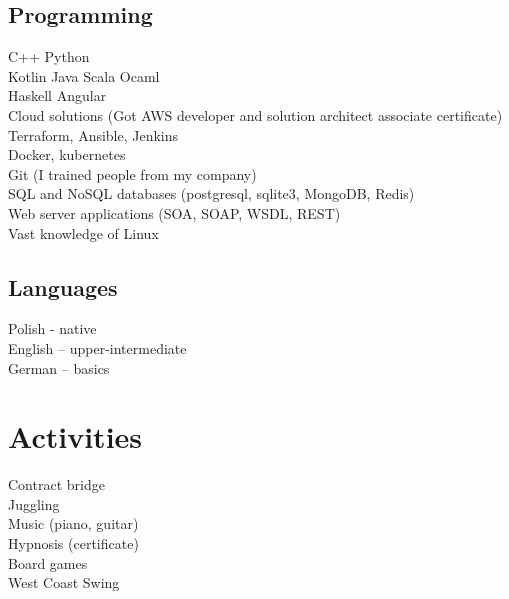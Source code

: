 \documentclass[]{deedy-resume-openfont}
\begin{document}
\begin{minipage}[t]{0.30\textwidth}
\subsection{Programming}
C++
\textbullet{} Python \\
Kotlin
\textbullet{} Java
\textbullet{} Scala
\textbullet{} Ocaml \\
Haskell
\textbullet{} Angular \\
\vspace{5pt}
\textbullet{} Cloud solutions (Got AWS developer and solution architect associate certificate) \\
\textbullet{} Terraform, Ansible, Jenkins\\
\textbullet{} Docker, kubernetes\\
\textbullet{} Git (I trained people from my company) \\
\textbullet{} SQL and NoSQL databases (postgresql, sqlite3, MongoDB, Redis) \\
\textbullet{} Web server applications (SOA, SOAP, WSDL, REST) \\
\textbullet{} Vast knowledge of Linux
\sectionsep

\subsection{Languages}
\textbullet{} Polish - native \\
\textbullet{} English – upper-intermediate \\
\textbullet{} German – basics \\
\sectionsep


\section{Activities}
\textbullet{} Contract bridge \\
\textbullet{} Juggling \\
\textbullet{} Music (piano, guitar) \\
\textbullet{} Hypnosis (certificate)\\
\textbullet{} Board games \\
\textbullet{} West Coast Swing \\


%
%

\end{minipage} 
\end{document}
